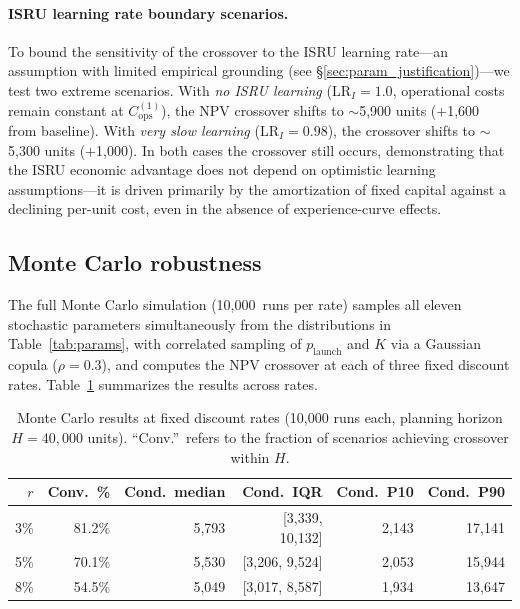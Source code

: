 \documentclass[preprint,12pt]{elsarticle}
\begin{document}
\paragraph{ISRU learning rate boundary scenarios.} To bound the sensitivity of the crossover to the ISRU learning rate---an assumption with limited empirical grounding (see \S\ref{sec:param_justification})---we test two extreme scenarios. With \emph{no ISRU learning} ($\mathrm{LR}_I = 1.0$, operational costs remain constant at $C_{\mathrm{ops}}^{(1)}$), the NPV crossover shifts to $\sim$5{,}900 units ($+$1{,}600 from baseline). With \emph{very slow learning} ($\mathrm{LR}_I = 0.98$), the crossover shifts to $\sim$5{,}300 units ($+$1{,}000). In both cases the crossover still occurs, demonstrating that the ISRU economic advantage does not depend on optimistic learning assumptions---it is driven primarily by the amortization of fixed capital against a declining per-unit cost, even in the absence of experience-curve effects.

\subsection{Monte Carlo robustness}
\label{sec:mc_robustness}

The full Monte Carlo simulation (10{,}000~runs per rate) samples all eleven stochastic parameters simultaneously from the distributions in Table~\ref{tab:params}, with correlated sampling of $p_{\mathrm{launch}}$ and $K$ via a Gaussian copula ($\rho = 0.3$), and computes the NPV crossover at each of three fixed discount rates. Table~\ref{tab:mc_summary} summarizes the results across rates.

\begin{table}[htbp]
\centering
\caption{Monte Carlo results at fixed discount rates (10{,}000 runs each, planning horizon $H = 40{,}000$ units). ``Conv.''\ refers to the fraction of scenarios achieving crossover within $H$.}
\label{tab:mc_summary}
\small
\begin{tabular}{@{}rrrrrr@{}}
\toprule
$r$ & Conv.\ \% & Cond.\ median & Cond.\ IQR & Cond.\ P10 & Cond.\ P90 \\
\midrule
3\%  & 81.2\% & 5{,}793 & [3{,}339, 10{,}132] & 2{,}143 & 17{,}141 \\
5\%  & 70.1\% & 5{,}530 & [3{,}206, 9{,}524]  & 2{,}053 & 15{,}944 \\
8\%  & 54.5\% & 5{,}049 & [3{,}017, 8{,}587]  & 1{,}934 & 13{,}647 \\
\bottomrule
\end{tabular}
\end{table}
\end{document}
